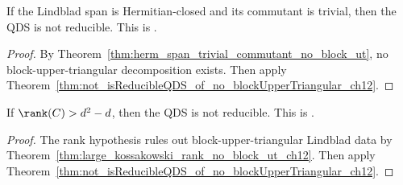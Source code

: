\begin{theorem}
    \label{thm:not_isReducible_of_hermitian_span_trivial_commutant}
    \leanok
    If the Lindblad span is Hermitian-closed and its commutant is trivial,
    then the QDS is not reducible.
    This is \cite[Corollary~7.2(2)]{Wolf2012Quantum}.
\end{theorem}
\begin{proof}\leanok
    By Theorem~\ref{thm:herm_span_trivial_commutant_no_block_ut}, no
    block-upper-triangular decomposition exists. Then apply
    Theorem~\ref{thm:not_isReducibleQDS_of_no_blockUpperTriangular_ch12}.
\end{proof}

\begin{theorem}
    \label{thm:not_isReducible_of_kossakowski_rank_ge}
    \leanok
    If $\rank(C) > d^2 - d$, then the QDS is not reducible.
    This is \cite[Corollary~7.2(3)]{Wolf2012Quantum}.
\end{theorem}
\begin{proof}\leanok
    The rank hypothesis rules out block-upper-triangular Lindblad data by
    Theorem~\ref{thm:large_kossakowski_rank_no_block_ut_ch12}. Then apply
    Theorem~\ref{thm:not_isReducibleQDS_of_no_blockUpperTriangular_ch12}.
\end{proof}